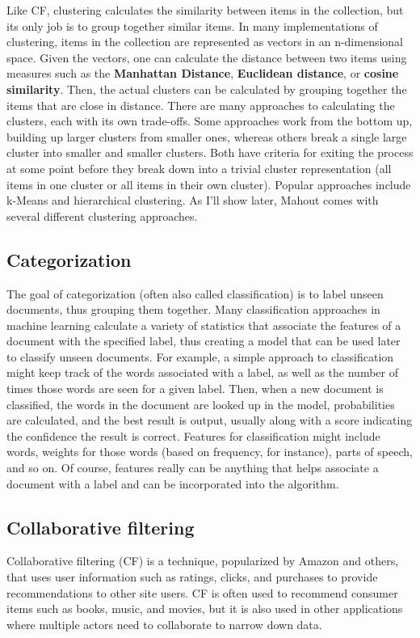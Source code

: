 \documentclass[12pt]{article}
\begin{document}
Like CF, clustering calculates the similarity between items in the collection, but its only job is to group together similar items. In many implementations of clustering, items in the collection are represented as vectors in an n-dimensional space. Given the vectors, one can calculate the distance between two items using measures such as the \textbf{Manhattan Distance}, \textbf{Euclidean distance}, or \textbf{cosine similarity}. Then, the actual clusters can be calculated by grouping together the items that are close in distance.
There are many approaches to calculating the clusters, each with its own trade-offs. Some approaches work from the bottom up, building up larger clusters from smaller ones, whereas others break a single large cluster into smaller and smaller clusters. Both have criteria for exiting the process at some point before they break down into a trivial cluster representation (all items in one cluster or all items in their own cluster). Popular approaches include k-Means and hierarchical clustering. As I'll show later, Mahout comes with several different clustering approaches.

\subsection{Categorization}
The goal of categorization (often also called classification) is to label unseen documents, thus grouping them together. Many classification approaches in machine learning calculate a variety of statistics that associate the features of a document with the specified label, thus creating a model that can be used later to classify unseen documents. For example, a simple approach to classification might keep track of the words associated with a label, as well as the number of times those words are seen for a given label. Then, when a new document is classified, the words in the document are looked up in the model, probabilities are calculated, and the best result is output, usually along with a score indicating the confidence the result is correct.
Features for classification might include words, weights for those words (based on frequency, for instance), parts of speech, and so on. Of course, features really can be anything that helps associate a document with a label and can be incorporated into the algorithm.
\subsection{Collaborative filtering}
Collaborative filtering (CF) is a technique, popularized by Amazon and others, that uses user information such as ratings, clicks, and purchases to provide recommendations to other site users. CF is often used to recommend consumer items such as books, music, and movies, but it is also used in other applications where multiple actors need to collaborate to narrow down data. 
\end{document}
